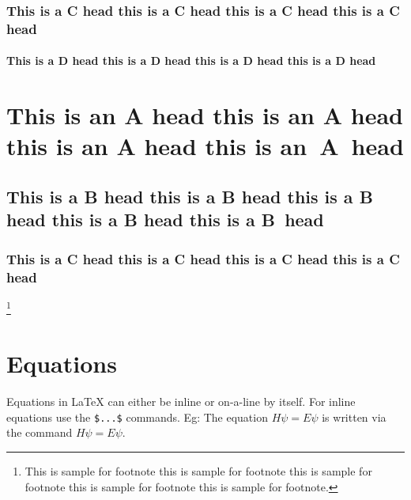 \documentclass{CUP-JNL-DTM}%
\theoremstyle{definition}
\numberwithin{equation}{section}
\begin{document}
\lipsum[2]

\subsubsection{This is a C head this is a C head this is a C head this is a C head}

\lipsum[3]

\paragraph{This is a D head this is a D head this is a D head this is a D head}

\lipsum[4]

\section[This is an A Head]{This is an A head this is an A head this is an A head this is an~A~head}
\subsection{This is a B head this is a B head this is a B head this is a B head this is a B~head}
\subsubsection{This is a C head this is a C head this is a C head this is a C head}
\lipsum[4]\footnote{This is sample for footnote this is sample for footnote this is sample for footnote  this is sample for footnote this is sample for footnote.}

\section{Equations}

Equations in \LaTeX{} can either be inline or on-a-line by itself. For
inline equations use the \verb+$...$+ commands. Eg: The equation
$H\psi = E \psi$ is written via the command $H \psi = E \psi$.
\end{document}
